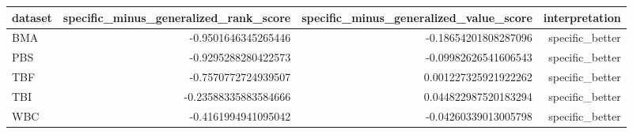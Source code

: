 \begin{tabular}{lrrr}
\hline
dataset & specific\_minus\_generalized\_rank\_score & specific\_minus\_generalized\_value\_score & interpretation \\
\hline
BMA & -0.9501646345265446 & -0.18654201808287096 & specific\_better \\
PBS & -0.9295288280422573 & -0.09982626541606543 & specific\_better \\
TBF & -0.7570772724939507 & 0.001227325921922262 & specific\_better \\
TBI & -0.23588335883584666 & 0.044822987520183294 & specific\_better \\
WBC & -0.4161994941095042 & -0.04260339013005798 & specific\_better \\
\hline
\end{tabular}
